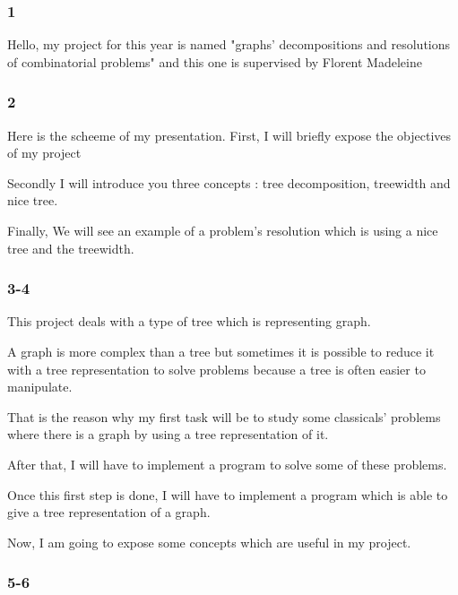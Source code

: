 \documentclass[a4paper, 10pt,french,landscape]{article}
\begin{document}
\begin{multicols}{3}

\subsubsection*{ 1 }

Hello,
my project for this year is named "graphs' decompositions and resolutions of combinatorial problems" 
and this one is supervised by Florent Madeleine

\subsubsection*{ 2}

Here is the scheeme of my presentation. 
First, I will briefly expose the objectives of my project

Secondly I will introduce you three concepts : tree decomposition, treewidth and nice tree.

Finally, We will see an example of a problem's resolution which is using a nice tree and the treewidth.


\subsubsection*{ 3-4}





This project deals with a type of tree which is representing graph.

 A graph is more complex than a tree but sometimes it is possible to reduce it with a tree representation to solve problems because a tree is often easier to manipulate.

That is the reason why my first task will be to study some classicals' problems where there is a graph by using a tree representation of it.

After that, I will have to implement a program to solve some of these problems.

Once this first step is done, I will have to implement a program which is able to give a tree representation of a graph.

Now, I am going to expose some concepts which are useful in my project.



\subsubsection*{ 5-6}





\end{multicols}
\end{document}
